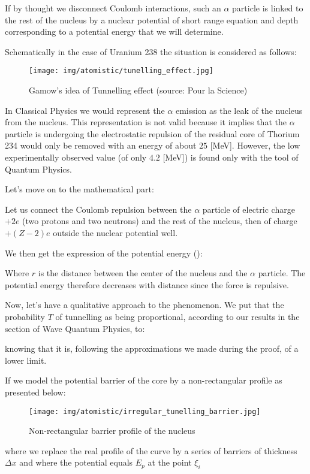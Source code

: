 	If by thought we disconnect Coulomb interactions, such an $\alpha$ particle is linked to the rest of the nucleus by a nuclear potential of short range equation and depth corresponding to a potential energy that we will determine.

	Schematically in the case of Uranium 238 the situation is considered as follows:
	\begin{figure}[H]
		\centering
		\texttt{[image: img/atomistic/tunelling\_effect.jpg]}
		\caption[Gamow's idea of Tunnelling effect]{Gamow's idea of Tunnelling effect (source: Pour la Science)}
	\end{figure}
	In Classical Physics we would represent the $\alpha$ emission as the leak of the nucleus from the nucleus. This representation is not valid because it implies that the $\alpha$ particle is undergoing the electrostatic repulsion of the residual core of Thorium 234 would only be removed with an energy of about $25$ [MeV]. However, the low experimentally observed value (of only $4.2$ [MeV]) is found only with the tool of Quantum Physics.
	
	Let's move on to the mathematical part:
	
	Let us connect the Coulomb repulsion between the $\alpha$ particle of electric charge $+2e$ (two protons and two neutrons) and the rest of the nucleus, then of charge $+(Z-2)e$ outside the nuclear potential well.

	We then get the expression of the potential energy ():
	
	Where $r$ is the distance between the center of the nucleus and the $\alpha$ particle. The potential energy therefore decreases with distance since the force is repulsive.

	Now, let's have a qualitative approach to the phenomenon. We put that the probability $T$ of tunnelling as being proportional, according to our results in the section of Wave Quantum Physics, to:
	
	knowing that it is, following the approximations we made during the proof, of a lower limit.

	If we model the potential barrier of the core by a non-rectangular profile as presented below:
	\begin{figure}[H]
		\centering
		\texttt{[image: img/atomistic/irregular\_tunelling\_barrier.jpg]}
		\caption{Non-rectangular barrier profile of the nucleus}
	\end{figure}
	where we replace the real profile of the curve by a series of barriers of thickness $\Delta x$ and where the potential equals $E_p$ at the point $\xi_i$

